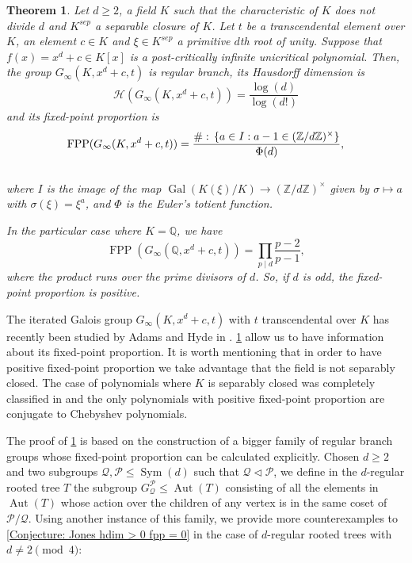 \documentclass{amsart}
\def\set#1{{\def\st{\;:\;}\left\{#1\right\}}}
\def\ZZ{\mathbb Z}
\def\QQ{\mathbb Q}
\DeclareMathOperator{\Gal}{Gal}
\DeclareMathOperator{\Aut}{Aut}
\DeclareMathOperator{\FPP}{FPP}
\DeclareMathOperator{\Sym}{Sym}
\DeclareMathOperator{\st}{st}
\newtheorem{Theorem}{Theorem}
\begin{document}
\begin{Theorem}
Let $d \geq 2$, a field $K$ such that the characteristic of $K$ does not divide $d$ and $K^{sep}$ a separable closure of $K$. Let $t$ be a transcendental element over $K$, an element $c \in K$ and $\xi \in K^{sep}$ a primitive $d$th root of unity. Suppose that $f(x) = x^d + c \in K[x]$ is a post-critically infinite unicritical polynomial. Then, the group $G_\infty(K,x^d+c,t)$ is regular branch, its Hausdorff dimension is $$\mathcal{H}(G_\infty(K,x^d+c,t)) = \frac{\log(d)}{\log(d!)}$$ and its fixed-point proportion is $$\FPP(G_\infty(K,x^d+c,t)) = \frac{\# \set{a \in I: a-1 \in (\ZZ/d\ZZ)^\times}}{\Phi(d)},$$ \\ where $I$ is the image of the map $\Gal(K(\xi)/K) \rightarrow (\ZZ/d\ZZ)^\times$ given by $\sigma \mapsto a$ with $\sigma(\xi) = \xi^a$, and $\Phi$ is the Euler's totient function. 

In the particular case where $K = \QQ$, we have $$\FPP(G_\infty(\QQ,x^d+c,t)) = \prod_{p \mid d} \frac{p-2}{p-1},$$ where the product runs over the prime divisors of $d$. So, if $d$ is odd, the fixed-point proportion is positive.
\label{theorem: FPP x^d+1}
\end{Theorem}

The iterated Galois group $G_\infty(K,x^d+c,t)$ with $t$ transcendental over $K$ has recently been studied by Adams and Hyde in \cite{AdamsHyde2025}. \cref{theorem: FPP x^d+1} allow us to have information about its fixed-point proportion. It is worth mentioning that in order to have positive fixed-point proportion we take advantage that the field is not separably closed. The case of polynomials where $K$ is separably closed was completely classified in \cite{FariñaRadi2026FPP} and the only polynomials with positive fixed-point proportion are conjugate to Chebyshev polynomials. 

The proof of \cref{theorem: FPP x^d+1} is based on the construction of a bigger family of regular branch groups whose fixed-point proportion can be calculated explicitly. Chosen $d \geq 2$ and two subgroups $\mathcal{Q}, \mathcal{P} \leq \Sym(d)$ such that $\mathcal{Q} \lhd \mathcal{P}$, we define in the $d$-regular rooted tree $T$ the subgroup $G_\mathcal{Q}^\mathcal{P} \leq \Aut(T)$ consisting of all the elements in $\Aut(T)$ whose action over the children of any vertex is in the same coset of $\mathcal{P}/\mathcal{Q}$. Using another instance of this family, we provide more counterexamples to \cref{Conjecture: Jones hdim > 0 fpp = 0} in the case of $d$-regular rooted trees with $d \neq 2 \pmod{4}$:
\end{document}
